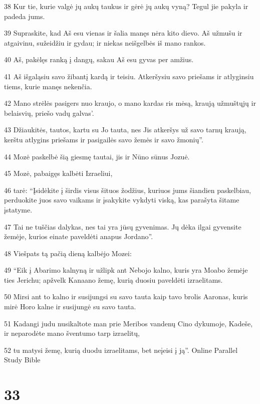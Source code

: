 \par 38 Kur tie, kurie valgė jų aukų taukus ir gėrė jų aukų vyną? Tegul jie pakyla ir padeda jums. 
\par 39 Supraskite, kad Aš esu vienas ir šalia manęs nėra kito dievo. Aš užmušu ir atgaivinu, sužeidžiu ir gydau; ir niekas neišgelbės iš mano rankos. 
\par 40 Aš, pakėlęs ranką į dangų, sakau­ Aš esu gyvas per amžius. 
\par 41 Aš išgaląsiu savo žibantį kardą ir teisiu. Atkeršysiu savo priešams ir atlyginsiu tiems, kurie manęs nekenčia. 
\par 42 Mano strėlės pasigers nuo kraujo, o mano kardas ris mėsą, kraują užmuštųjų ir belaisvių, priešo vadų galvas’. 
\par 43 Džiaukitės, tautos, kartu su Jo tauta, nes Jis atkeršys už savo tarnų kraują, kerštu atlygins priešams ir pasigailės savo žemės ir savo žmonių”. 
\par 44 Mozė paskelbė šią giesmę tautai, jis ir Nūno sūnus Jozuė. 
\par 45 Mozė, pabaigęs kalbėti Izraeliui, 
\par 46 tarė: “Įsidėkite į širdis visus šituos žodžius, kuriuos jums šiandien paskelbiau, perduokite juos savo vaikams ir įsakykite vykdyti viską, kas parašyta šitame įstatyme. 
\par 47 Tai ne tuščias dalykas, nes tai yra jūsų gyvenimas. Jų dėka ilgai gyvensite žemėje, kurios einate paveldėti anapus Jordano”. 
\par 48 Viešpats tą pačią dieną kalbėjo Mozei: 
\par 49 “Eik į Abarimo kalnyną ir užlipk ant Nebojo kalno, kuris yra Moabo žemėje ties Jerichu; apžvelk Kanaano žemę, kurią duosiu paveldėti izraelitams. 
\par 50 Mirsi ant to kalno ir susijungsi su savo tauta kaip tavo brolis Aaronas, kuris mirė Horo kalne ir susijungė su savo tauta. 
\par 51 Kadangi judu nusikaltote man prie Meribos vandenų Cino dykumoje, Kadeše, ir neparodėte mano šventumo tarp izraelitų, 
\par 52 tu matysi žemę, kurią duodu izraelitams, bet neįeisi į ją”.
Online Parallel Study Bible



\chapter{33}

